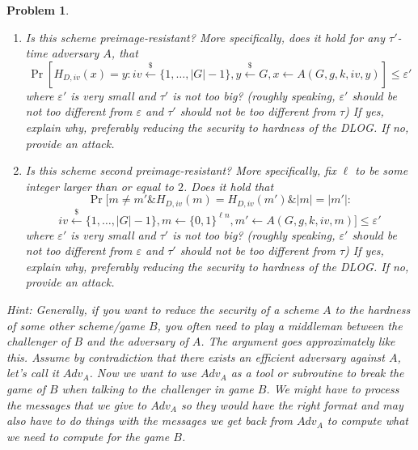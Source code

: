 \documentclass{../homework}
\newtheorem{problem}{Problem}
\newcommand{\rgets}{\stackrel{\mathdollar}\leftarrow}
\begin{document}
\begin{problem}
\begin{enumerate}
        \item Is this scheme preimage-resistant? More specifically, does it hold
        for any $\tau'$-time adversary $A$, that
        $$
            \Pr[H_{D,iv}(x)=y :iv \rgets\{1,\dots,|G|-1\},y \rgets G, x\gets
            A(G,g,k,iv,y) ]\leq \varepsilon'
        $$
        where $\varepsilon'$ is very small  and $\tau'$ is not too big? (roughly
        speaking, $\varepsilon'$ should be not too different from $\varepsilon$
        and $\tau'$ should not be too different from $\tau$)
        If yes, explain why, preferably reducing the security to hardness of the
        DLOG. If no, provide an attack.
        
        \item Is this scheme second preimage-resistant? More specifically, fix
        $\ell$ to be some integer larger than or equal to $2$. Does it hold that
        $$\Pr[m\neq m'\& H_{D,iv}(m)=H_{D,iv}(m')\&  |m|=|m'| :$$
        $$
            iv \rgets\{1,\dots,|G|-1\},m\gets \{0,1\}^{\ell n}, m'\gets
            A(G,g,k,iv,m) ]\leq \varepsilon'
        $$
        where $\varepsilon'$ is very small  and $\tau'$ is not too big? (roughly
        speaking, $\varepsilon'$ should be not too different from $\varepsilon$
        and $\tau'$ should not be too different from $\tau$)
        If yes, explain why, preferably reducing the security to hardness of the
        DLOG. If no, provide an attack.
        \end{enumerate}

        Hint: Generally, if you want to reduce the security of a scheme $A$ to
        the hardness of some other scheme/game $B$, you often need to play a
        middleman between the challenger of $B$ and the adversary of $A$.
        The argument goes approximately like this. Assume by contradiction that
        there exists an efficient adversary against $A$, let's call it $Adv_A$.
        Now we want to use $Adv_A$ as a tool or subroutine to break the game of
        $B$ when talking to the challenger in game $B$. We might have to process
        the messages that we give to $Adv_A$ so they would have the right format
        and  may also have to do things with the messages we get back from
        $Adv_A$ to compute what we need to compute for the game $B$.
\end{problem}
\end{document}

